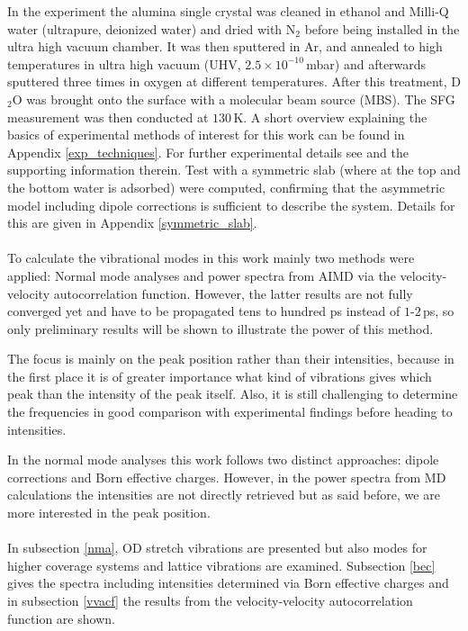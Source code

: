 \documentclass[11pt,DIV=13,BCOR=5mm,a4paper,headinclude]{scrbook}
\begin{document}
In the experiment the alumina single crystal was cleaned in ethanol and Milli-Q water (ultrapure, deionized water) and dried with N$_2$ before being installed in the ultra high vacuum chamber.
It was then sputtered in Ar, and annealed to high temperatures in ultra high vacuum (UHV, $2.5\times 10^{-10}\,$mbar) and afterwards sputtered three times in oxygen at different temperatures.
After this treatment, D$_2$O was brought onto the surface with a molecular beam source (MBS).
The SFG measurement was then conducted at $130\,$K.
A short overview explaining the basics of experimental methods of interest for this work can be found in Appendix \ref{exp_techniques}.
For further experimental details see \cite{Heiden11-20_2018} and the supporting information therein.
Test with a symmetric slab (where at the top and the bottom water is adsorbed) were computed, confirming that the asymmetric model including dipole corrections is sufficient to describe the system.
Details for this are given in Appendix \ref{symmetric_slab}.
\\
\\

To calculate the vibrational modes in this work mainly two methods were applied: Normal mode analyses and power spectra from AIMD via the velocity-velocity autocorrelation function.
However, the latter results are not fully converged yet and have to be propagated tens to hundred ps instead of $1$-$2\,$ps, so only preliminary results will be shown to illustrate the power of this method.


The focus is mainly on the peak position rather than their intensities, because in the first place it is of greater importance what kind of vibrations gives which peak than the intensity of the peak itself.
Also, it is still challenging to determine the frequencies in good comparison with experimental findings before heading to intensities.


In the normal mode analyses this work follows two distinct approaches: dipole corrections and Born effective charges.
However, in the power spectra from MD calculations the intensities are not directly retrieved but as said before, we are more interested in the peak position.
\\\\

In subsection \ref{nma}, OD stretch vibrations are presented but also modes for higher coverage systems and lattice vibrations are examined.
Subsection \ref{bec} gives the spectra including intensities determined via Born effective charges and in subsection \ref{vvacf} the results from the velocity-velocity autocorrelation function are shown.
\end{document}
